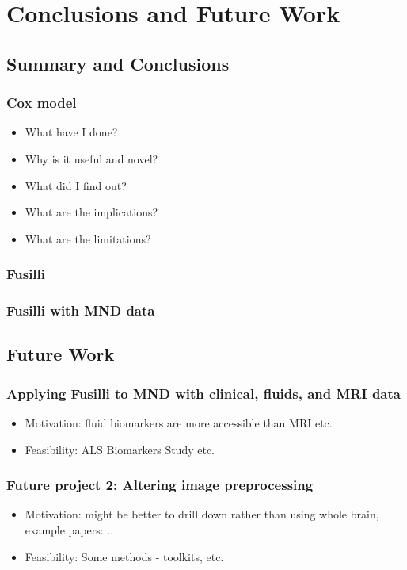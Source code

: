 \chapter{Conclusions and Future Work}
\label{conclusions_and_future_work}

\section{Summary and Conclusions}

\subsection{Cox model}
\begin{itemize}
    \item What have I done?
    \item Why is it useful and novel?
    \item What did I find out?
    \item What are the implications?
    \item What are the limitations?
\end{itemize}

\subsection{Fusilli}

\subsection{Fusilli with MND data}

\section{Future Work}
\subsection{Applying Fusilli to MND with clinical, fluids, and MRI data}
\begin{itemize}
    \item Motivation: fluid biomarkers are more accessible than MRI etc.
    \item Feasibility: ALS Biomarkers Study etc.
\end{itemize}

\subsection{Future project 2: Altering image preprocessing}
\begin{itemize}
    \item Motivation: might be better to drill down rather than using whole brain, example papers: ..
    \item Feasibility: Some methods - toolkits, etc.
\end{itemize}

